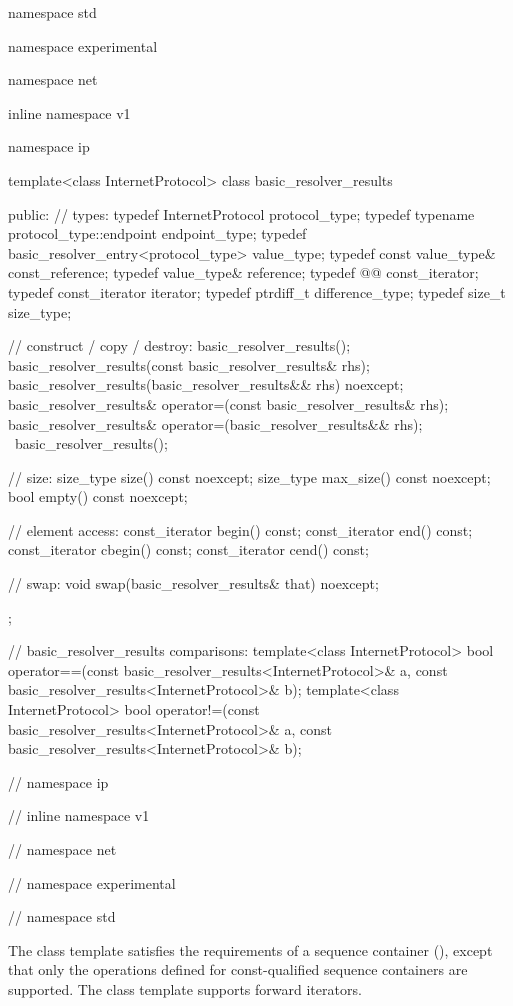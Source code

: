 \begin{codeblock}
namespace std {
namespace experimental {
namespace net {
inline namespace v1 {
namespace ip {

  template<class InternetProtocol>
  class basic_resolver_results
  {
  public:
    // types:
    typedef InternetProtocol protocol_type;
    typedef typename protocol_type::endpoint endpoint_type;
    typedef basic_resolver_entry<protocol_type> value_type;
    typedef const value_type& const_reference;
    typedef value_type& reference;
    typedef @@ const_iterator;
    typedef const_iterator iterator;
    typedef ptrdiff_t difference_type;
    typedef size_t size_type;

    // construct / copy / destroy:
    basic_resolver_results();
    basic_resolver_results(const basic_resolver_results& rhs);
    basic_resolver_results(basic_resolver_results&& rhs) noexcept;
    basic_resolver_results& operator=(const basic_resolver_results& rhs);
    basic_resolver_results& operator=(basic_resolver_results&& rhs);
    ~basic_resolver_results();

    // size:
    size_type size() const noexcept;
    size_type max_size() const noexcept;
    bool empty() const noexcept;

    // element access:
    const_iterator begin() const;
    const_iterator end() const;
    const_iterator cbegin() const;
    const_iterator cend() const;

    // swap:
    void swap(basic_resolver_results& that) noexcept;
  };

  // basic_resolver_results comparisons:
  template<class InternetProtocol>
    bool operator==(const basic_resolver_results<InternetProtocol>& a,
                    const basic_resolver_results<InternetProtocol>& b);
  template<class InternetProtocol>
    bool operator!=(const basic_resolver_results<InternetProtocol>& a,
                    const basic_resolver_results<InternetProtocol>& b);

} // namespace ip
} // inline namespace v1
} // namespace net
} // namespace experimental
} // namespace std
\end{codeblock}

\pnum
The class template  satisfies the requirements of a sequence container (), except that only the operations defined for const-qualified sequence containers are supported. The class template  supports forward iterators.

